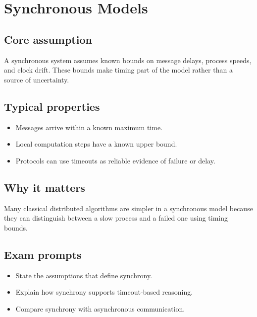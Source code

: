 \chapter{Synchronous Models}

\section{Core assumption}
\begin{defbox}
A synchronous system assumes known bounds on message delays, process speeds, and clock drift. These bounds make timing part of the model rather than a source of uncertainty.
\end{defbox}

\section{Typical properties}
\begin{itemize}
  \item Messages arrive within a known maximum time.
  \item Local computation steps have a known upper bound.
  \item Protocols can use timeouts as reliable evidence of failure or delay.
\end{itemize}

\section{Why it matters}
\begin{keybox}
Many classical distributed algorithms are simpler in a synchronous model because they can distinguish between a slow process and a failed one using timing bounds.
\end{keybox}

\section{Exam prompts}
\begin{itemize}
  \item State the assumptions that define synchrony.
  \item Explain how synchrony supports timeout-based reasoning.
  \item Compare synchrony with asynchronous communication.
\end{itemize}
